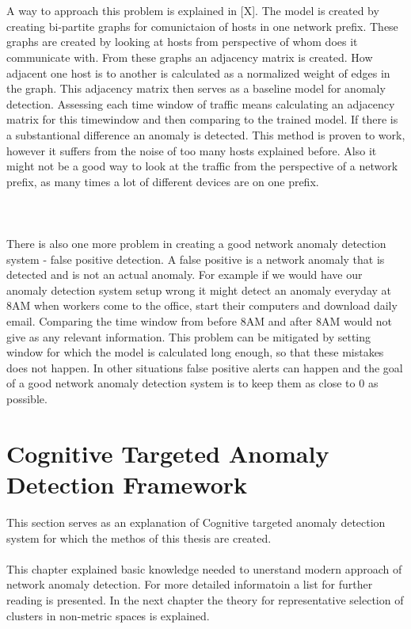 \documentclass[thesis=B,english]{FITthesis}[2012/10/20]
\begin{document}
\\ \\
A way to approach this problem is explained in [X].
The model is created by creating bi-partite graphs for comunictaion of hosts in one network prefix.
These graphs are created by looking at hosts from perspective of whom does it communicate with.
From these graphs an adjacency matrix is created.
How adjacent one host is to another is calculated as a normalized weight of edges in the graph.
This adjacency matrix then serves as a baseline model for anomaly detection.
Assessing each time window of traffic means calculating an adjacency matrix for this timewindow and then comparing to the trained model.
If there is a substantional difference an anomaly is detected.
This method is proven to work, however it suffers from the noise of too many hosts explained before.
Also it might not be a good way to look at the traffic from the perspective of a network prefix, as many times a lot of different devices are on one prefix.
\\ \\
\\ \\
There is also one more problem in creating a good network anomaly detection system - false positive detection.
A false positive is a network anomaly that is detected and is not an actual anomaly.
For example if we would have our anomaly detection system setup wrong it might detect an anomaly everyday at 8AM when workers come to the office, start their computers and download daily email.
Comparing the time window from before 8AM and after 8AM would not give as any relevant information.
This problem can be mitigated by setting window for which the model is calculated long enough, so that these mistakes does not happen.
In other situations false positive alerts can happen and the goal of a good network anomaly detection system is to keep them as close to 0 as possible.

\section{Cognitive Targeted Anomaly Detection Framework}
This section serves as an explanation of Cognitive targeted anomaly detection system for which the methos of this thesis are created.
\\ \\
This chapter explained basic knowledge needed to unerstand modern approach of network anomaly detection.
For more detailed informatoin a list for further reading is presented.
In the next chapter the theory for representative selection of clusters in non-metric spaces is explained.
\end{document}
